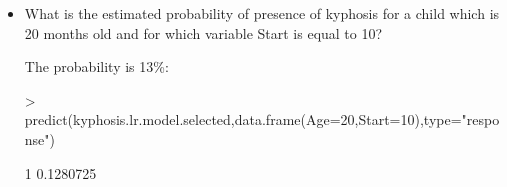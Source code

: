 \documentclass[a4paper]{article}
\begin{document}
\begin{itemize}
\begin{itemize}
By selecting the model based on AIC and LRT:\\
Residual deviance decreased from 61 to 51:
\begin{Schunk}
\begin{Sinput}
> kyphosis.lr.model$deviance
\end{Sinput}
\begin{Soutput}
[1] 61.37993
\end{Soutput}
\begin{Sinput}
> kyphosis.lr.model.selected$deviance
\end{Sinput}
\begin{Soutput}
[1] 51.29752
\end{Soutput}
\end{Schunk}
Proportions of explained deviance increased from 26\% to 38\%:
\begin{Schunk}
\begin{Sinput}
> 1-kyphosis.lr.model$deviance/kyphosis.lr.model$null.deviance
\end{Sinput}
\begin{Soutput}
[1] 0.2625661
\end{Soutput}
\begin{Sinput}
> 1-kyphosis.lr.model.selected$deviance/kyphosis.lr.model.selected$null.deviance
\end{Sinput}
\begin{Soutput}
[1] 0.3836986
\end{Soutput}
\end{Schunk}
AIC criterion decreased from 69 to 61:
\begin{Schunk}
\begin{Sinput}
> kyphosis.lr.model$aic
\end{Sinput}
\begin{Soutput}
[1] 69.37993
\end{Soutput}
\begin{Sinput}
> kyphosis.lr.model.selected$aic
\end{Sinput}
\begin{Soutput}
[1] 61.29752
\end{Soutput}
\end{Schunk}
\end{itemize}
\item What is the estimated probability of presence of kyphosis for a child which is
20 months old and for which variable Start is equal to 10?

The probability is 13\%:
\begin{Schunk}
\begin{Sinput}
> predict(kyphosis.lr.model.selected,data.frame(Age=20,Start=10),type="response")
\end{Sinput}
\begin{Soutput}
        1 
0.1280725 
\end{Soutput}
\end{Schunk}
\end{itemize}
\end{document}
